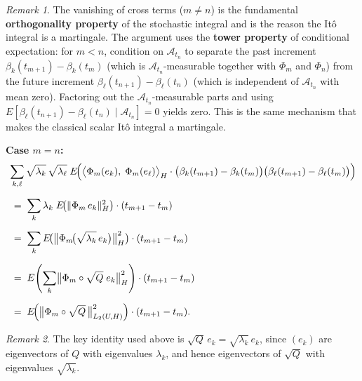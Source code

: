 \documentclass[11pt]{article}
\theoremstyle{definition}
\theoremstyle{remark}
\newtheorem{remark}{Remark}
\begin{document}
\begin{remark}
The vanishing of cross terms ($m \neq n$) is the fundamental \textbf{orthogonality property} of the stochastic integral and is the reason the It\^o integral is a martingale.
The argument uses the \textbf{tower property} of conditional expectation: for $m < n$, condition on $\mathcal{A}_{t_n}$ to separate the past increment $\beta_k(t_{m+1}) - \beta_k(t_m)$ (which is $\mathcal{A}_{t_n}$-measurable together with $\Phi_m$ and $\Phi_n$) from the future increment $\beta_\ell(t_{n+1}) - \beta_\ell(t_n)$ (which is independent of $\mathcal{A}_{t_n}$ with mean zero).
Factoring out the $\mathcal{A}_{t_n}$-measurable parts and using $E[\beta_\ell(t_{n+1}) - \beta_\ell(t_n) \mid \mathcal{A}_{t_n}] = 0$ yields zero.
This is the same mechanism that makes the classical scalar It\^o integral a martingale.
\end{remark}

\noindent\textbf{Case $m = n$:}
\begin{align*}
    &\sum_{k,\ell}
    \sqrt{\lambda_k}\,\sqrt{\lambda_\ell}\;
    E\!\Bigl(
        \bigl\langle \Phi_m(e_k),\;\Phi_m(e_\ell)
        \bigr\rangle_H
        \cdot
        \bigl(\beta_k(t_{m+1}) - \beta_k(t_m)\bigr)
        \bigl(\beta_\ell(t_{m+1}) - \beta_\ell(t_m)\bigr)
    \Bigr) \\[6pt]
    &\;=\;
    \sum_{k}
    \lambda_k\;
    E\!\bigl(\|\Phi_m\,e_k\|_H^2\bigr)
    \cdot (t_{m+1} - t_m) \\[6pt]
    &\;=\;
    \sum_{k}
    E\!\bigl(
        \bigl\|\Phi_m\!\bigl(\sqrt{\lambda_k}\,e_k\bigr)
        \bigr\|_H^2
    \bigr)
    \cdot (t_{m+1} - t_m) \\[6pt]
    &\;=\;
    E\!\left(
        \sum_{k}
        \bigl\|\Phi_m \circ \sqrt{Q}\;e_k\bigr\|_H^2
    \right)
    \cdot (t_{m+1} - t_m) \\[6pt]
    &\;=\;
    E\!\Bigl(
        \bigl\|\Phi_m \circ \sqrt{Q}\,\bigr\|_{L_2(U,H)}^2
    \Bigr)
    \cdot (t_{m+1} - t_m).
\end{align*}


\begin{remark}
The key identity used above is $\sqrt{Q}\,e_k = \sqrt{\lambda_k}\,e_k$,
since $(e_k)$ are eigenvectors of $Q$ with eigenvalues $\lambda_k$,
and hence eigenvectors of $\sqrt{Q}$ with eigenvalues $\sqrt{\lambda_k}$.
\end{remark}
\end{document}
